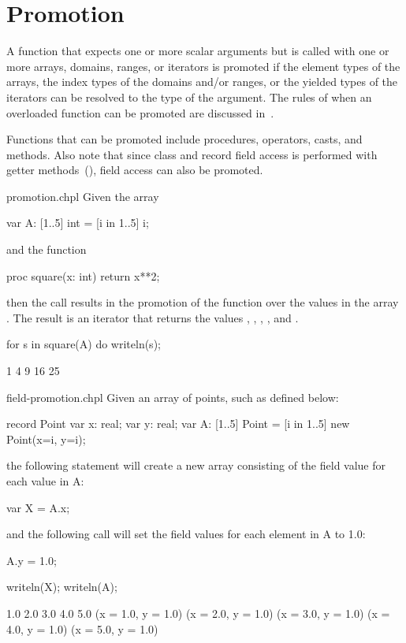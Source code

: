 \section{Promotion}
\label{Promotion}

A function that expects one or more scalar arguments but is called
with one or more arrays, domains, ranges, or iterators is promoted if
the element types of the arrays, the index types of the domains and/or
ranges, or the yielded types of the iterators can be resolved to the
type of the argument.  The rules of when an overloaded function can be
promoted are discussed in~.

Functions that can be promoted include procedures, operators, casts,
and methods. Also note that since class and record field access
is performed with getter methods~(), field
access can also be promoted.

\begin{chapelexample}{promotion.chpl}
Given the array
\begin{chapel}
var A: [1..5] int = [i in 1..5] i;
\end{chapel}
and the function
\begin{chapel}
proc square(x: int) return x**2;
\end{chapel}
then the call  results in the promotion of
the  function over the values in the array .  The
result is an iterator that returns the
values , , , , and .
\begin{chapelnoprint}
for s in square(A) do writeln(s);
\end{chapelnoprint}
\begin{chapeloutput}
1
4
9
16
25
\end{chapeloutput}
\end{chapelexample}

\begin{chapelexample}{field-promotion.chpl}
Given an array of points, such as  defined below:
\begin{chapel}
record Point {
  var x: real;
  var y: real;
}
var A: [1..5] Point = [i in 1..5] new Point(x=i, y=i);
\end{chapel}
the following statement will create a new array consisting of
the  field value for each value in A:
\begin{chapel}
var X = A.x;
\end{chapel}
and the following call will set the  field values for each
element in A to 1.0:
\begin{chapel}
A.y = 1.0;
\end{chapel}

\begin{chapelnoprint}
writeln(X);
writeln(A);
\end{chapelnoprint}
\begin{chapeloutput}
1.0 2.0 3.0 4.0 5.0
(x = 1.0, y = 1.0) (x = 2.0, y = 1.0) (x = 3.0, y = 1.0) (x = 4.0, y = 1.0) (x = 5.0, y = 1.0)
\end{chapeloutput}
\end{chapelexample}


